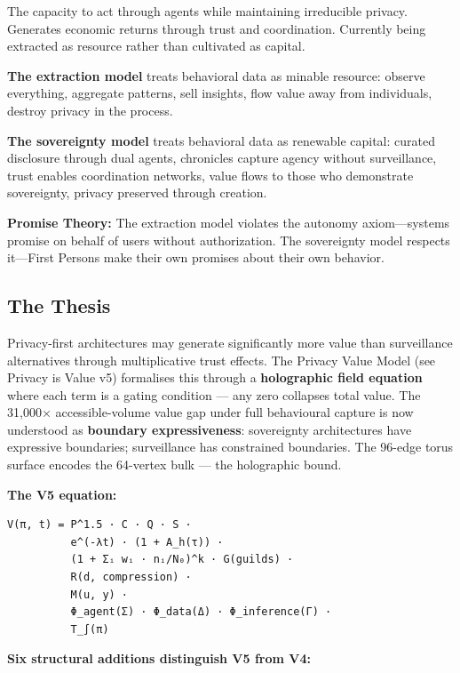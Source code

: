 \documentclass[
  11pt,
]{article}
\begin{document}
The capacity to act through agents while maintaining irreducible
privacy. Generates economic returns through trust and coordination.
Currently being extracted as resource rather than cultivated as capital.

\textbf{The extraction model} treats behavioral data as minable
resource: observe everything, aggregate patterns, sell insights, flow
value away from individuals, destroy privacy in the process.

\textbf{The sovereignty model} treats behavioral data as renewable
capital: curated disclosure through dual agents, chronicles capture
agency without surveillance, trust enables coordination networks, value
flows to those who demonstrate sovereignty, privacy preserved through
creation.

\textbf{Promise Theory:} The extraction model violates the autonomy
axiom---systems promise on behalf of users without authorization. The
sovereignty model respects it---First Persons make their own promises
about their own behavior.

\subsection{The Thesis}\label{the-thesis}

Privacy-first architectures may generate significantly more value than
surveillance alternatives through multiplicative trust effects. The
Privacy Value Model (see Privacy is Value v5) formalises this through a
\textbf{holographic field equation} where each term is a gating
condition --- any zero collapses total value. The 31,000×
accessible-volume value gap under full behavioural capture is now
understood as \textbf{boundary expressiveness}: sovereignty
architectures have expressive boundaries; surveillance has constrained
boundaries. The 96-edge torus surface encodes the 64-vertex bulk --- the
holographic bound.

\textbf{The V5 equation:}

\begin{verbatim}
V(π, t) = P^1.5 · C · Q · S ·
          e^(-λt) · (1 + A_h(τ)) ·
          (1 + Σᵢ wᵢ · nᵢ/N₀)^k · G(guilds) ·
          R(d, compression) ·
          M(u, y) ·
          Φ_agent(Σ) · Φ_data(Δ) · Φ_inference(Γ) ·
          T_∫(π)
\end{verbatim}

\textbf{Six structural additions distinguish V5 from V4:}
\end{document}
